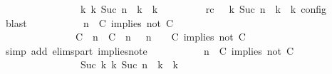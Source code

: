 \begin{isabellebody}
\ \ \ \ \ \ \ \ \ \ \ \ \ \ \ \ {\isasymhookrightarrow}\isactrlbsup k\isactrlesup \ {\isacharparenleft}{\isasymGamma}\isactrlsub k{\isacharcomma}\ Suc\ n\ {\isasymturnstile}\ {\isasymPsi}\isactrlsub k\ {\isasymtriangleright}\ {\isasymPhi}\isactrlsub k{\isacharparenright}{\isacartoucheclose}\isanewline
\ \ \ \ \ \ \ \ \ rc{\isacharcolon}{\isacartoucheopen}{\isasymrho}\ {\isasymin}\ {\isasymlbrakk}\ {\isasymGamma}\isactrlsub k{\isacharcomma}\ Suc\ n\ {\isasymturnstile}\ {\isasymPsi}\isactrlsub k\ {\isasymtriangleright}\ {\isasymPhi}\isactrlsub k\ {\isasymrbrakk}\isactrlsub c\isactrlsub o\isactrlsub n\isactrlsub f\isactrlsub i\isactrlsub g{\isacartoucheclose}\ \isamarkupfalse%
\ blast\isanewline
\ \ \ \ \ \ \ \ \isamarkupfalse%
\ {\isacartoucheopen}{\isacharparenleft}{\isasymGamma}{\isacharcomma}\ n\ {\isasymturnstile}\ {\isacharparenleft}{\isacharparenleft}C\ implies\ not\ C\ {\isacharhash}\ {\isasymPsi}{\isacharparenright}\ {\isasymtriangleright}\ {\isasymPhi}{\isacharparenright}\isanewline
\ \ \ \ \ \ \ \ \ \ \ \ \ \ {\isasymhookrightarrow}\ {\isacharparenleft}{\isacharparenleft}{\isacharparenleft}C\ {\isasymUp}\ n{\isacharparenright}\ {\isacharhash}\ {\isacharparenleft}C\ {\isasymnot}{\isasymUp}\ n{\isacharparenright}\ {\isacharhash}\ {\isasymGamma}{\isacharparenright}{\isacharcomma}\ n\ {\isasymturnstile}\ {\isasymPsi}\ {\isasymtriangleright}\ {\isacharparenleft}{\isacharparenleft}C\ implies\ not\ C\ {\isacharhash}\ {\isasymPhi}{\isacharparenright}{\isacharparenright}{\isacartoucheclose}\isanewline
\ \ \ \ \ \ \ \ \ \ \isamarkupfalse%
\ {\isacharparenleft}simp\ add{\isacharcolon}\ elims{\isacharunderscore}part\ implies{\isacharunderscore}not{\isacharunderscore}e{}{\isacharparenright}\isanewline
\ \ \ \ \ \ \ \ \isamarkupfalse%
\ {\isacartoucheopen}{\isacharparenleft}{\isasymGamma}{\isacharcomma}\ n\ {\isasymturnstile}\ {\isacharparenleft}{\isacharparenleft}C\ implies\ not\ C\ {\isacharhash}\ {\isasymPsi}{\isacharparenright}\ {\isasymtriangleright}\ {\isasymPhi}{\isacharparenright}\isanewline
\ \ \ \ \ \ \ \ \ \ \ \ \ \ \ \ {\isasymhookrightarrow}\isactrlbsup Suc\ k\isactrlesup \ {\isacharparenleft}{\isasymGamma}\isactrlsub k{\isacharcomma}\ Suc\ n\ {\isasymturnstile}\ {\isasymPsi}\isactrlsub k\ {\isasymtriangleright}\ {\isasymPhi}\isactrlsub k{\isacharparenright}{\isacartoucheclose}\isanewline

\end{isabellebody}
